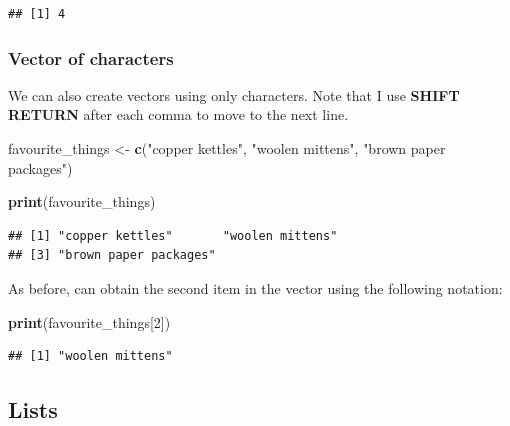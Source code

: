 \documentclass[
]{krantz}
\makeatletter
\newenvironment{Shaded}{\begin{snugshade}}{\end{snugshade}}
\newcommand{\DecValTok}[1]{\textcolor[rgb]{0.06,0.06,0.06}{#1}}
\newcommand{\KeywordTok}[1]{\textcolor[rgb]{0.27,0.27,0.27}{\textbf{#1}}}
\newcommand{\NormalTok}[1]{#1}
\newcommand{\StringTok}[1]{\textcolor[rgb]{0.5,0.5,0.5}{#1}}
\newenvironment{kframe}{%
\medskip{}
\setlength{\fboxsep}{.8em}
 \def\at@end@of@kframe{}%
 \ifinner\ifhmode%
  \def\at@end@of@kframe{\end{minipage}}%
  \begin{minipage}{\columnwidth}%
 \fi\fi%
 \def\FrameCommand##1{\hskip\@totalleftmargin \hskip-\fboxsep
 \colorbox{shadecolor}{##1}\hskip-\fboxsep
     \hskip-\linewidth \hskip-\@totalleftmargin \hskip\columnwidth}%
 \MakeFramed {\advance\hsize-\width
   \@totalleftmargin\z@ \linewidth\hsize
   \@setminipage}}%
 {\par\unskip\endMakeFramed%
 \at@end@of@kframe}
\renewenvironment{Shaded}{\begin{kframe}}{\end{kframe}}
\makeatother
\begin{document}
\begin{verbatim}
## [1] 4
\end{verbatim}

\hypertarget{vector-of-characters}{%
\subsubsection{Vector of characters}\label{vector-of-characters}}

We can also create vectors using only characters. Note that I use \textbf{SHIFT RETURN} after each comma to move to the next line.

\begin{Shaded}
\begin{Highlighting}[]
\NormalTok{favourite_things <-}\StringTok{ }\KeywordTok{c}\NormalTok{(}\StringTok{"copper kettles"}\NormalTok{,}
                      \StringTok{"woolen mittens"}\NormalTok{,}
                      \StringTok{"brown paper packages"}\NormalTok{)}
\end{Highlighting}
\end{Shaded}

\begin{Shaded}
\begin{Highlighting}[]
\KeywordTok{print}\NormalTok{(favourite_things)}
\end{Highlighting}
\end{Shaded}

\begin{verbatim}
## [1] "copper kettles"       "woolen mittens"      
## [3] "brown paper packages"
\end{verbatim}

As before, can obtain the second item in the vector using the following notation:

\begin{Shaded}
\begin{Highlighting}[]
\KeywordTok{print}\NormalTok{(favourite_things[}\DecValTok{2}\NormalTok{])}
\end{Highlighting}
\end{Shaded}

\begin{verbatim}
## [1] "woolen mittens"
\end{verbatim}

\hypertarget{lists}{%
\subsection{Lists}\label{lists}}
\end{document}

